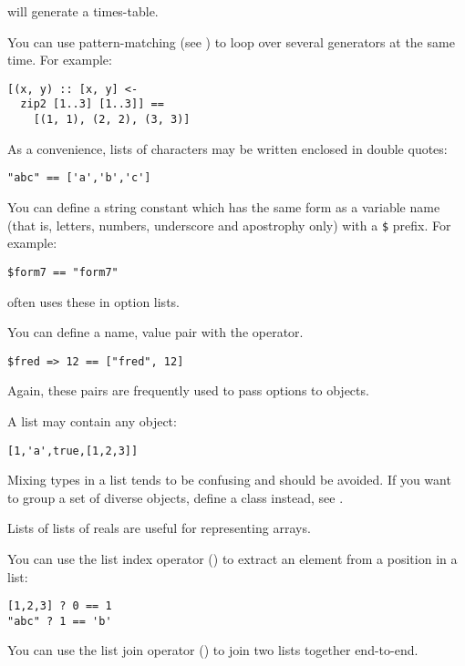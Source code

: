 \noindent
will generate a times-table.

You can use pattern-matching (see ) to loop over several 
generators at the same time. For example:

\begin{verbatim}
[(x, y) :: [x, y] <- 
  zip2 [1..3] [1..3]] == 
    [(1, 1), (2, 2), (3, 3)]
\end{verbatim}

As a convenience, lists of characters may be written enclosed in double
quotes:

\begin{verbatim}
"abc" == ['a','b','c']
\end{verbatim}

You can define a string constant which has the same form as a variable name 
(that is, letters, numbers, underscore and apostrophy only) with a \verb+$+
prefix. For example:

\begin{verbatim}
$form7 == "form7"
\end{verbatim}

\noindent
\nip{} often uses these in option lists.

You can define a name, value pair with the \ct{=>} operator. 

\begin{verbatim}
$fred => 12 == ["fred", 12]
\end{verbatim}

\noindent
Again, these pairs are frequently used to pass options to objects.

A list may contain any object:

\begin{verbatim}
[1,'a',true,[1,2,3]] 
\end{verbatim}

\noindent
Mixing types in a list tends to be confusing and should be avoided. If you
want to group a set of diverse objects, define a class instead, 
see .

Lists of lists of reals are useful for representing arrays.

You can use the list index operator () to extract an element from a
position in a list:

\begin{verbatim}
[1,2,3] ? 0 == 1
"abc" ? 1 == 'b'
\end{verbatim}

You can use the list join operator (\ct{++}) to join two lists together
end-to-end.

